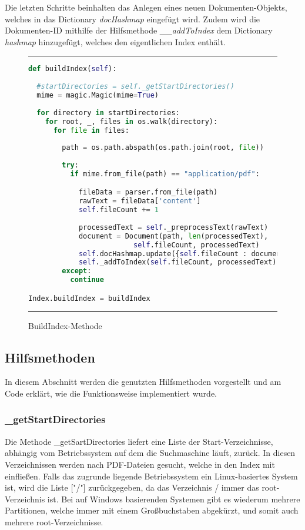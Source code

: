 Die letzten Schritte beinhalten das Anlegen eines neuen Dokumenten-Objekts, welches in das Dictionary \emph{docHashmap} eingefügt wird. Zudem wird die Dokumenten-ID mithilfe der Hilfsmethode \_\_\emph{addToIndex} dem Dictionary \emph{hashmap} hinzugefügt, welches den eigentlichen Index enthält.

\begin{figure}[h]
	\rule{\textwidth}{0.4pt}
		\begin{lstlisting}[language=Python]
def buildIndex(self):
    
  #startDirectories = self._getStartDirectories()
  mime = magic.Magic(mime=True)
    
  for directory in startDirectories:
    for root, _, files in os.walk(directory):
      for file in files:
                
        path = os.path.abspath(os.path.join(root, file))
                
        try:
          if mime.from_file(path) == "application/pdf":

            fileData = parser.from_file(path)
            rawText = fileData['content']
            self.fileCount += 1
                    
            processedText = self._preprocessText(rawText)
            document = Document(path, len(processedText),
                         self.fileCount, processedText)
            self.docHashmap.update({self.fileCount : document})
            self._addToIndex(self.fileCount, processedText)
        except:
          continue

Index.buildIndex = buildIndex
		\end{lstlisting}
	\rule{\textwidth}{0.4pt}
	\caption{BuildIndex-Methode}
	\label{fig:build}
\end{figure}

\subsection{Hilfsmethoden}\label{hilfsmethoden}

In diesem Abschnitt werden die genutzten Hilfsmethoden vorgestellt und am Code erklärt, wie die Funktionsweise implementiert wurde.

\subsubsection{\_getStartDirectories}

Die Methode \_getSartDirectories liefert eine Liste der Start-Verzeichnisse, abhängig vom Betriebssystem auf dem die Suchmaschine läuft, zurück. In diesen Verzeichnissen werden nach PDF-Dateien gesucht, welche in den Index mit einfließen. Falls das zugrunde liegende Betriebssystem ein Linux-basiertes System ist, wird die Liste ["/"] zurückgegeben, da das Verzeichnis / immer das root-Verzeichnis ist. Bei auf Windows basierenden Systemen gibt es wiederum mehrere Partitionen, welche immer mit einem Großbuchstaben abgekürzt, und somit auch mehrere root-Verzeichnisse.


